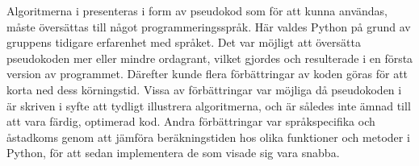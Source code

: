 

Algoritmerna i \cite{HaraldSieve} presenteras i form av pseudokod som för att kunna användas, måste översättas till något programmeringsspråk.
Här valdes Python på grund av gruppens tidigare erfarenhet med språket. 
Det var möjligt att översätta pseudokoden mer eller mindre ordagrant, vilket gjordes och resulterade i en första version av programmet.
Därefter kunde flera förbättringar av koden göras för att korta ned dess körningstid. 
Vissa av förbättringar var möjliga då pseudokoden i \cite{HaraldSieve} är skriven i syfte att tydligt illustrera algoritmerna,
och är således inte ämnad till att vara färdig, optimerad kod.
Andra förbättringar var språkspecifika och åstadkoms genom att jämföra beräkningstiden hos olika funktioner och metoder i Python, för att sedan implementera de som visade sig vara snabba.



